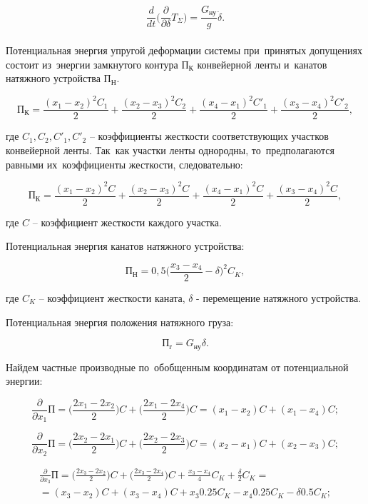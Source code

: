 $$ \frac{d}{dt} \Big(\frac{\partial}{\partial \delta}T_\Sigma \Big) = \frac{G_\text{ну}}{g} \ddot \delta. $$\\

Потенциальная энергия упругой деформации системы при~принятых допущениях состоит из~энергии замкнутого контура $ \text{П}_\text{К} $ конвейерной ленты и~канатов натяжного устройства $ \text{П}_\text{Н} $.

$$ \text{П}_\text{К} = \frac{(x_1 - x_2)^2 C_1}{2} + \frac{(x_2 - x_3)^2 C_2}{2} + \frac{(x_4 - x_1)^2 C'_1}{2} + \frac{(x_3 - x_4)^2 C'_2}{2}, $$

где $ C_1, C_2, C'_1, C'_2 $ – коэффициенты жесткости соответствующих участков конвейерной ленты. Так~как участки ленты однородны, то~предполагаются равными их~коэффициенты жесткости, следовательно:

$$ \text{П}_\text{К} = \frac{(x_1 - x_2)^2 C}{2} + \frac{(x_2 - x_3)^2 C}{2} + \frac{(x_4 - x_1)^2 C}{2} + \frac{(x_3 - x_4)^2 C}{2}, $$

где $ C $ – коэффициент жесткости каждого участка.

Потенциальная энергия канатов натяжного устройства:

$$ \text{П}_\text{Н} = 0,5 \Big( \frac{x_3 - x_4}{2} - \delta \Big)^2 C_K, $$

где $ C_K $ – коэффициент жесткости каната, $ \delta $ - перемещение натяжного устройства.

Потенциальная энергия положения натяжного груза:

$$ \text{П}_\text{г} = G_\text{ну} \delta. $$

Найдем частные производные по~обобщенным координатам от потенциальной энергии:

$$ \frac{\partial}{\partial x_1}\text{П} = \Big( \frac{2x_1 - 2x_2}{2} \Big) C + \Big( \frac{2x_1 - 2x_4}{2} \Big)C = (x_1 - x_2)C + (x_1 - x_4)C;$$

$$ \frac{\partial}{\partial x_2}\text{П} = \Big( \frac{2x_2 - 2x_1}{2} \Big) C + \Big( \frac{2x_2 - 2x_3}{2} \Big)C = (x_2 - x_1)C + (x_2 - x_3)C;$$

\begin{eqnarray} 
\frac{\partial}{\partial x_3}\text{П} = 	\Big( \frac{2x_3 - 2x_2}{2} \Big) C + 
		  				\Big( \frac{2x_3 - 2x_4}{2} \Big)C + 
						\frac{x_3 - x_4}{4}C_K + 
						\frac{\delta}{2}C_K = 
					\nonumber \\ = 
						(x_3 - x_2)C + 
						(x_3 - x_4)C + 
						x_3 0.25 C_K - 
						x_4 0.25 C_K - 
						\delta 0.5 C_K;  
					\nonumber 
\end{eqnarray}

